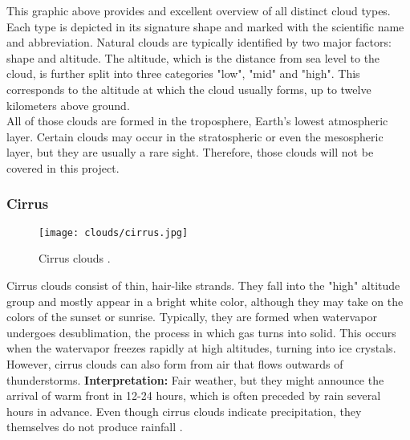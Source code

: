 \noindent
This graphic above provides and excellent overview of all distinct cloud types.
Each type is depicted in its signature shape and marked with the scientific name and abbreviation.
Natural clouds are typically identified by two major factors: shape and \gls{altitude}.
The \gls{altitude}, which is the distance from sea level to the cloud, is further split into three categories "low", "mid" and "high".
This corresponds to the altitude at which the cloud usually forms, up to twelve kilometers above ground. 
\\
All of those clouds are formed in the troposphere, Earth's lowest atmospheric layer.
Certain clouds may occur in the stratospheric or even the mesospheric layer, but they are usually a rare sight. Therefore, those clouds will not be covered in this project.


\pagebreak

\subsubsection{Cirrus}
\begin{wrapfigure}[10]{r}{6cm}
    \vspace{-\baselineskip}
    \texttt{[image: clouds/cirrus.jpg]}
    \caption{Cirrus clouds \protect\cite{cloudtypes:wiki:cirrus}.}
    \label{img:clouds:cirrus}
\end{wrapfigure}
Cirrus clouds consist of thin, hair-like strands.
They fall into the "high" altitude group and mostly appear in a bright white color, although they may take on the colors of the sunset or sunrise.
Typically, they are formed when \gls{watervapor} undergoes \gls{desublimation}, the process in which gas turns into solid. This occurs when the \gls{watervapor} freezes rapidly at high altitudes, turning into ice crystals.
\\
\noindent
However, cirrus clouds can also form from air that flows outwards of thunderstorms.
\emptyline
\textbf{Interpretation:} Fair weather, but they might announce the arrival of warm front in 12-24 hours, which is often preceded by rain several hours in advance.
Even though cirrus clouds indicate \gls{precipitation}, they themselves do not produce rainfall \cite{predict:weather}.

